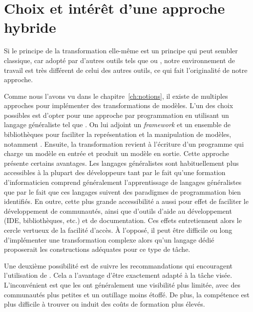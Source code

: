 \section{Choix et intérêt d'une approche hybride}
\label{approach:sec:hybride}

Si le principe de la transformation elle-même est un principe qui peut sembler
classique, car adopté par d'autres outils tels que {\qvt} ou {\atl}, notre
environnement de travail est très différent de celui des autres outils, ce qui
fait l'originalité de notre approche. %

Comme nous l'avons vu dans le chapitre~\ref{ch:notions}, il existe de multiples
approches pour implémenter des transformations de modèles. L'un des choix
possibles est d'opter pour une approche par programmation en utilisant un
langage généraliste tel que {\java}. On lui adjoint un \emph{framework} et un
ensemble de bibliothèques pour faciliter la représentation et la manipulation
de modèles, notamment {\emf}. Ensuite, la transformation revient à l'écriture
d'un programme qui charge un modèle en entrée et produit un modèle en sortie.
Cette approche présente certains avantages. Les langages généralistes sont
habituellement plus accessibles à la plupart des développeurs tant par le fait
qu'une formation d'informaticien comprend généralement l'apprentissage de
langages généralistes que par le fait que ces langages suivent des paradigmes
de programmation bien identifiés. En outre, cette plus grande accessibilité a
aussi pour effet de faciliter le développement de communautés, ainsi que
d'outils d'aide au développement (IDE, bibliothèques, etc.) et de
documentation. Ces effets entretiennent alors le cercle vertueux de la facilité
d'accès. À l'opposé, il peut être difficile ou long d'implémenter une
transformation complexe alors qu'un langage dédié proposerait les constructions
adéquates pour ce type de tâche.

Une deuxième possibilité est de suivre les recommandations {\mda} qui
encouragent l'utilisation de {\dsl}. Cela a l'avantage d'être exactement adapté
à la tâche visée. L'inconvénient est que les {\dsl} ont généralement une
visibilité plus limitée, avec des communautés plus petites et un outillage
moins étoffé. De plus, la compétence est plus difficile à trouver ou induit des
coûts de formation plus élevés.

